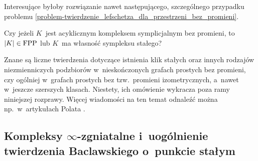 Interesujące byłoby rozwiązanie nawet następującego, szczególnego przypadku problemu \ref{problem-twierdzenie_lefschetza_dla_przestrzeni_bez_promieni}.

\begin{problem}\label{problem-acykliczny_to_fpp}
Czy jeżeli $K$~jest acyklicznym kompleksem symplicjalnym bez promieni, to $|K|\in\mathrm{FPP}$ lub $K$~ma własność sympleksu stałego?
\end{problem}

\begin{comment}
Szanse powodzenia wydaje się mieć próba połaczenia wyników Okhezina z~ideami rozdziału \ref{chap4}. Autor jest zdania, że poniższe  zagadnienie, choć sformułowane w~mało precyzyjny sposób, ma zadowalające rozwiązanie, korzystające z~twierdzenia \ref{tw-okhezina-brouwera}.

\begin{problem}\label{prob8}
Zdefiniować klasę kompleksów symplicjalnych ,,lokalnie bez promieni'', których ograniczone (w~odpowiednim sensie) podzbiory nie zawierają promieni. Podać twierdzenie o~istnieniu punktu lub końca stałego przy założeniu, że $K$~jest ściągalnym kompleksem symplicjalnym ,,lokalnie bez promieni'' spełniającym odpowiednik warunku oswojoności do wewnątrz, zaś $f\colon |K|\to |K|$ jest  ciągłym odwzorowaniem o~tej własności, że zbiór $f^{-1}(A)$~jest bez promieni dla każdego podzbioru $A\subseteq |K|$ bez promieni.
\end{problem}
\end{comment}

Znane są liczne twierdzenia dotyczące istnienia klik stałych oraz innych rodzajów niezmienniczych podzbiorów w~nieskończonych grafach prostych bez promieni, czy ogólniej w~grafach prostych bez tzw.~promieni izometrycznych, a~nawet w~jeszcze szerszych klasach. Niestety, ich omówienie wykracza poza ramy niniejszej rozprawy. Więcej wiadomości na ten temat odnaleźć można np.~w~artykułach Polata \cite{Polat93,Polat95,Polat96,Polat98,Polat04,Polat09,Polat12,Polat94}.




\subsection{\texorpdfstring{Kompleksy $\infty$-zgniatalne i~uogólnienie twierdzenia Baclawskiego o~punkcie stałym}{Kompleksy ∞-zgniatalne i~uogólnienie twierdzenia Baclawskiego o~punkcie stałym}}\label{subsec-tw_Baclawskiego}

